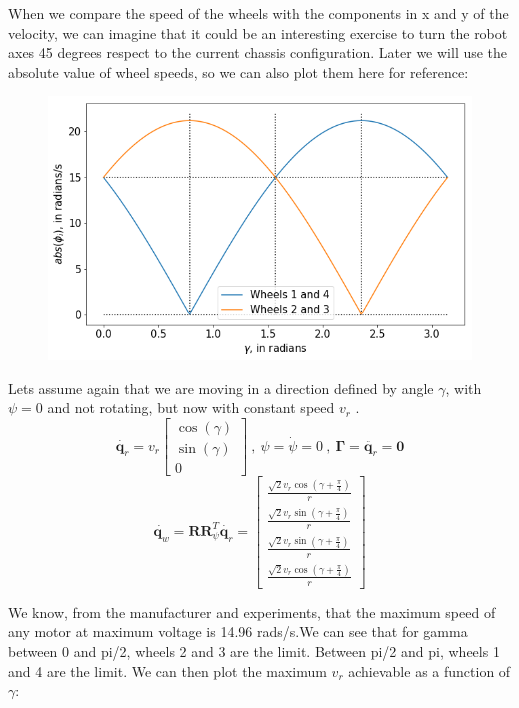 \documentclass[12pt]{article}
\renewcommand{\vec}[1]{\bm{#1}}
\newcommand{\R}{\mathbb R}
\def\Torque{\vec \Gamma}
\def\R{\vec R}
\def\q{\vec q}
\begin{document}
When we compare the speed of the wheels with the components in x and y of the velocity, we can imagine that it could be an interesting exercise to turn the robot axes 45 degrees respect to the current chassis configuration. Later we will use the absolute value of wheel speeds, so we can also plot them here for reference:
\begin{figure}[h]
	\centering
	\includegraphics[width=.5\linewidth]{abs_wheel_speeds}
	\label{fig:abs_wheel_speed}
\end{figure}

Lets assume again that we are moving in a direction defined by angle $\gamma$, with $\psi = 0$ and not rotating, but now with constant speed $v_r$ .
$$\dot{\q_r} = v_r\left[\begin{matrix}\operatorname{cos}\left(\gamma\right)\\\operatorname{sin}\left(\gamma\right)\\0\end{matrix}\right]\ ,\ \psi = \dot{\psi} = 0\ ,\ \Torque = \ddot{\q_r} = \vec{0}$$
$$ \dot{\q_w} = \R\R_{\psi}^T\dot{\q_r} = \left[\begin{matrix}\frac{\sqrt{2} v_{r} \operatorname{cos}\left(\gamma + \frac{\pi}{4}\right)}{r}\\\frac{\sqrt{2} v_{r} \operatorname{sin}\left(\gamma + \frac{\pi}{4}\right)}{r}\\\frac{\sqrt{2} v_{r} \operatorname{sin}\left(\gamma + \frac{\pi}{4}\right)}{r}\\\frac{\sqrt{2} v_{r} \operatorname{cos}\left(\gamma + \frac{\pi}{4}\right)}{r}\end{matrix}\right]$$

We know, from the manufacturer and experiments, that the maximum speed of any motor at maximum voltage is 14.96 rads/s.We can see that for gamma between 0 and pi/2, wheels 2 and 3 are the limit. Between pi/2 and pi, wheels 1 and 4 are the limit. We can then plot the maximum $v_r$ achievable as a function of $\gamma$:
\end{document}
